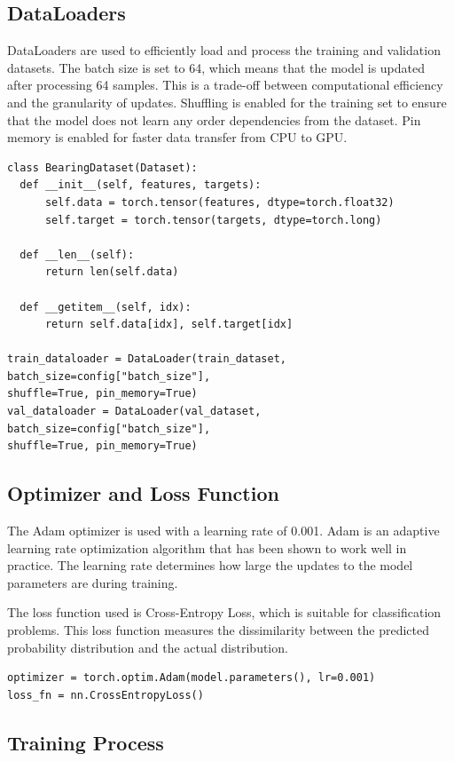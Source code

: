 \subsection*{DataLoaders}

DataLoaders are used to efficiently load and process the training and validation datasets. The batch size is set to 64, which means that the model is updated after processing 64 samples. This is a trade-off between computational efficiency and the granularity of updates. Shuffling is enabled for the training set to ensure that the model does not learn any order dependencies from the dataset. Pin memory is enabled for faster data transfer from CPU to GPU.

\begin{verbatim}
class BearingDataset(Dataset):
  def __init__(self, features, targets):
      self.data = torch.tensor(features, dtype=torch.float32)
      self.target = torch.tensor(targets, dtype=torch.long)

  def __len__(self):
      return len(self.data)

  def __getitem__(self, idx):
      return self.data[idx], self.target[idx]

train_dataloader = DataLoader(train_dataset, batch_size=config["batch_size"],
shuffle=True, pin_memory=True)
val_dataloader = DataLoader(val_dataset, batch_size=config["batch_size"],
shuffle=True, pin_memory=True)
\end{verbatim}

\subsection*{Optimizer and Loss Function}

The Adam optimizer is used with a learning rate of 0.001. Adam is an adaptive learning rate optimization algorithm that has been shown to work well in practice. The learning rate determines how large the updates to the model parameters are during training.

The loss function used is Cross-Entropy Loss, which is suitable for classification problems. This loss function measures the dissimilarity between the predicted probability distribution and the actual distribution.

\begin{verbatim}
optimizer = torch.optim.Adam(model.parameters(), lr=0.001)
loss_fn = nn.CrossEntropyLoss()
\end{verbatim}

\subsection*{Training Process}

